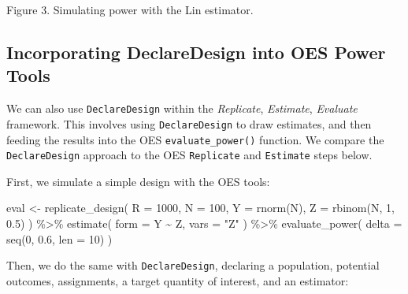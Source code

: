 \documentclass[
  12pt,
]{book}
\newenvironment{Shaded}{\begin{snugshade}}{\end{snugshade}}
\newcommand{\AttributeTok}[1]{\textcolor[rgb]{0.77,0.63,0.00}{#1}}
\newcommand{\DecValTok}[1]{\textcolor[rgb]{0.00,0.00,0.81}{#1}}
\newcommand{\FloatTok}[1]{\textcolor[rgb]{0.00,0.00,0.81}{#1}}
\newcommand{\FunctionTok}[1]{\textcolor[rgb]{0.00,0.00,0.00}{#1}}
\newcommand{\NormalTok}[1]{#1}
\newcommand{\OtherTok}[1]{\textcolor[rgb]{0.56,0.35,0.01}{#1}}
\newcommand{\SpecialCharTok}[1]{\textcolor[rgb]{0.00,0.00,0.00}{#1}}
\newcommand{\StringTok}[1]{\textcolor[rgb]{0.31,0.60,0.02}{#1}}
\theoremstyle{definition}
\theoremstyle{definition}
\theoremstyle{definition}
\theoremstyle{remark}
\begin{document}
Figure 3. Simulating power with the Lin estimator.

\hypertarget{incorporating-declaredesign-into-oes-power-tools}{%
\subsection{Incorporating DeclareDesign into OES Power
Tools}\label{incorporating-declaredesign-into-oes-power-tools}}

We can also use \texttt{DeclareDesign} within the \emph{Replicate},
\emph{Estimate}, \emph{Evaluate} framework. This involves using
\texttt{DeclareDesign} to draw estimates, and then feeding the results
into the OES \texttt{evaluate\_power()} function. We compare the
\texttt{DeclareDesign} approach to the OES \texttt{Replicate} and
\texttt{Estimate} steps below.

First, we simulate a simple design with the OES tools:

\begin{Shaded}
\begin{Highlighting}[]
\NormalTok{eval }\OtherTok{\textless{}{-}}
  \FunctionTok{replicate\_design}\NormalTok{(}
    \AttributeTok{R =} \DecValTok{1000}\NormalTok{,}
    \AttributeTok{N =} \DecValTok{100}\NormalTok{,}
    \AttributeTok{Y =} \FunctionTok{rnorm}\NormalTok{(N),}
    \AttributeTok{Z =} \FunctionTok{rbinom}\NormalTok{(N, }\DecValTok{1}\NormalTok{, }\FloatTok{0.5}\NormalTok{)}
\NormalTok{  ) }\SpecialCharTok{\%\textgreater{}\%}
  \FunctionTok{estimate}\NormalTok{(}
    \AttributeTok{form =}\NormalTok{ Y }\SpecialCharTok{\textasciitilde{}}\NormalTok{ Z, }\AttributeTok{vars =} \StringTok{"Z"}
\NormalTok{  ) }\SpecialCharTok{\%\textgreater{}\%}
  \FunctionTok{evaluate\_power}\NormalTok{(}
    \AttributeTok{delta =} \FunctionTok{seq}\NormalTok{(}\DecValTok{0}\NormalTok{, }\FloatTok{0.6}\NormalTok{, }\AttributeTok{len =} \DecValTok{10}\NormalTok{)}
\NormalTok{  )}
\end{Highlighting}
\end{Shaded}

Then, we do the same with \texttt{DeclareDesign}, declaring a
population, potential outcomes, assignments, a target quantity of
interest, and an estimator:
\end{document}

